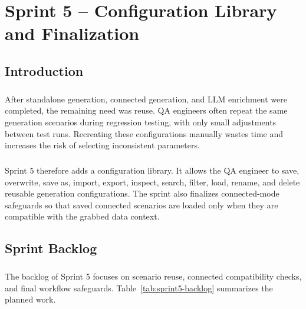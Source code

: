 \chapter{Sprint 5 -- Configuration Library and Finalization}

\setlength{\textfloatsep}{8pt plus 2pt minus 2pt}
\setlength{\floatsep}{8pt plus 2pt minus 2pt}
\setlength{\intextsep}{8pt plus 2pt minus 2pt}
\setlength{\abovecaptionskip}{4pt}
\setlength{\belowcaptionskip}{0pt}

\section*{Introduction}

\paragraph{}After standalone generation, connected generation, and LLM enrichment were completed,
the remaining need was reuse. QA engineers often repeat the same generation scenarios during
regression testing, with only small adjustments between test runs. Recreating these configurations
manually wastes time and increases the risk of selecting inconsistent parameters.

\paragraph{}Sprint 5 therefore adds a configuration library. It allows the QA engineer to save,
overwrite, save as, import, export, inspect, search, filter, load, rename, and delete reusable
generation configurations. The sprint also finalizes connected-mode safeguards so that saved
connected scenarios are loaded only when they are compatible with the grabbed data context.

\section{Sprint Backlog}

\paragraph{}The backlog of Sprint 5 focuses on scenario reuse, connected compatibility checks, and
final workflow safeguards. Table~\ref{tab:sprint5-backlog} summarizes the planned work.

